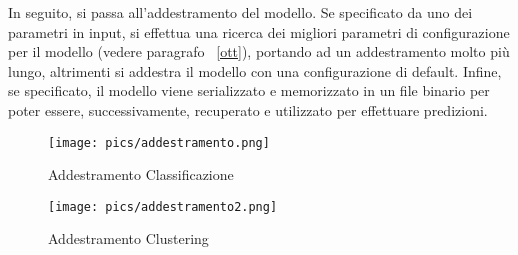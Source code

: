 \documentclass[12pt,oneside]{article}
\begin{document}
        \begin{justify}
        In seguito, si passa all’addestramento del modello. Se specificato da uno dei parametri in input, si effettua una ricerca dei migliori parametri di configurazione per il modello (vedere paragrafo ~\ref{ott}), portando ad un addestramento molto più lungo, altrimenti si addestra il modello con una configurazione di default. Infine, se specificato, il modello viene serializzato e memorizzato in un file binario per poter essere, successivamente, recuperato e utilizzato per effettuare predizioni.

        \begin{figure}[H]
        \centering
        \texttt{[image: pics/addestramento.png]}
        \caption{Addestramento Classificazione}
        \end{figure}
        \begin{figure}[H]
        \texttt{[image: pics/addestramento2.png]}
        \caption{Addestramento Clustering}
        \end{figure}
        
        \end{justify}

\newpage
\end{document}

